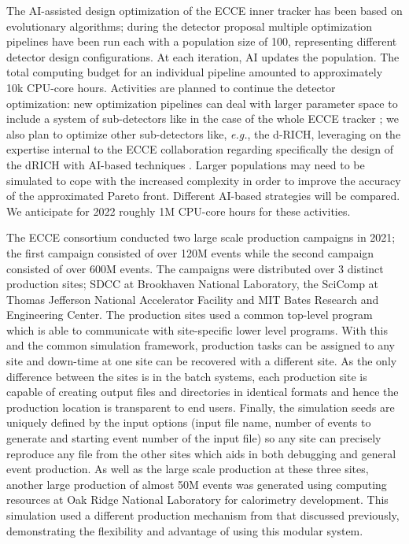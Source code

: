     The AI-assisted design optimization of the ECCE inner tracker \cite{ecce-note-comp-2021-03} has been based on evolutionary algorithms; during the detector proposal multiple optimization pipelines have been run each with a population size of 100, representing different detector design configurations. At each iteration, AI updates the population. The total computing budget for an individual pipeline amounted to approximately 10k CPU-core hours. 
    Activities are planned to continue the detector optimization: new optimization pipelines can deal with larger parameter space to include a system of sub-detectors like in the case of the whole ECCE tracker  \cite{ecce-note-comp-2021-03}; we also plan to optimize other sub-detectors like, \textit{e.g.}, the d-RICH, leveraging on the expertise internal to the ECCE collaboration regarding specifically the design of the dRICH with AI-based techniques \cite{cisbani2020ai}. 
    Larger populations may need to be simulated to cope with the increased complexity in order to improve the accuracy of the approximated Pareto front. Different AI-based strategies will be compared. 
    We anticipate for 2022 roughly 1M CPU-core hours for these activities.

	
	The ECCE consortium conducted two large scale production campaigns in 2021; the first campaign consisted of over 120M events while the second campaign consisted of over 600M events. The campaigns were distributed over 3 distinct production sites; SDCC at Brookhaven National Laboratory, the SciComp at Thomas Jefferson National Accelerator Facility and MIT Bates Research and Engineering Center. The production sites used a common top-level program which is able to communicate with site-specific lower level programs. With this and the common simulation framework, production tasks can be assigned to any site and down-time at one site can be recovered with a different site. As the only difference between the sites is in the batch systems, each production site is capable of creating output files and directories in identical formats and hence the production location is transparent to end users. Finally, the simulation seeds are uniquely defined by the input options (input file name, number of events to generate and starting event number of the input file) so any site can precisely reproduce any file from the other sites which aids in both debugging and general event production. As well as the large scale production at these three sites, another large production of almost 50M events was generated using computing resources at Oak Ridge National Laboratory for calorimetry development. This simulation used a different production mechanism from that discussed previously, demonstrating the flexibility and advantage of using this modular system.

